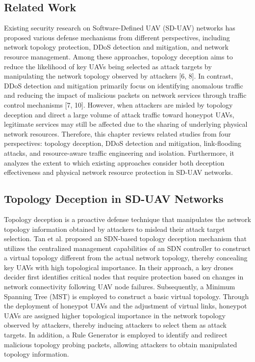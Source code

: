 \begin{ZhChapter}

\text

\chapter{Related Work}

Existing security research on Software-Defined UAV (SD-UAV) networks has proposed various defense mechanisms from different perspectives, including network topology protection, DDoS detection and mitigation, and network resource management. Among these approaches, topology deception aims to reduce the likelihood of key UAVs being selected as attack targets by manipulating the network topology observed by attackers [6, 8]. In contrast, DDoS detection and mitigation primarily focus on identifying anomalous traffic and reducing the impact of malicious packets on network services through traffic control mechanisms [7, 10]. However, when attackers are misled by topology deception and direct a large volume of attack traffic toward honeypot UAVs, legitimate services may still be affected due to the sharing of underlying physical network resources. Therefore, this chapter reviews related studies from four perspectives: topology deception, DDoS detection and mitigation, link-flooding attacks, and resource-aware traffic engineering and isolation. Furthermore, it analyzes the extent to which existing approaches consider both deception effectiveness and physical network resource protection in SD-UAV networks.

\section{Topology Deception in SD-UAV Networks}

Topology deception is a proactive defense technique that manipulates the network topology information obtained by attackers to mislead their attack target selection. Tan et al. \cite{tan:2022} proposed an SDN-based topology deception mechanism that utilizes the centralized management capabilities of an SDN controller to construct a virtual topology different from the actual network topology, thereby concealing key UAVs with high topological importance. In their approach, a key drones decider first identifies critical nodes that require protection based on changes in network connectivity following UAV node failures. Subsequently, a Minimum Spanning Tree (MST) is employed to construct a basic virtual topology. Through the deployment of honeypot UAVs and the adjustment of virtual links, honeypot UAVs are assigned higher topological importance in the network topology observed by attackers, thereby inducing attackers to select them as attack targets. In addition, a Rule Generator is employed to identify and redirect malicious topology probing packets, allowing attackers to obtain manipulated topology information.


\end{ZhChapter}
